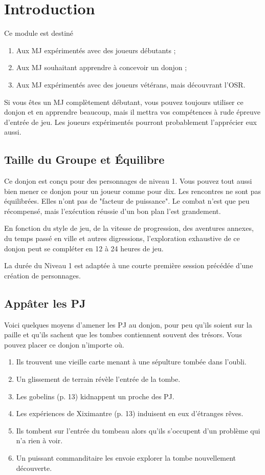 \chapter{Introduction}
Ce module est destiné
\begin{enumerate}
  \item Aux MJ expérimentés avec des joueurs débutants ;
  \item Aux MJ souhaitant apprendre à concevoir un donjon ;
  \item Aux MJ expérimentés avec des joueurs vétérans, mais découvrant l'OSR.
\end{enumerate}
Si vous êtes un MJ complètement débutant, vous pouvez toujours utiliser ce donjon et en apprendre beaucoup, mais il
mettra vos compétences à rude épreuve d'entrée de jeu.
Les joueurs expérimentés pourront probablement l'apprécier eux aussi.

\section{Taille du Groupe et Équilibre}
Ce donjon est conçu pour des personnages de niveau 1.
Vous pouvez tout aussi bien mener ce donjon pour un joueur comme pour dix.
Les rencontres ne sont pas équilibrées.
Elles n'ont pas de "facteur de puissance".
Le combat n'est que peu récompensé, mais l'exécution réussie d'un bon plan l'est grandement.

En fonction du style de jeu, de la vitesse de progression, des aventures annexes, du temps passé en ville et autres digressions, l'exploration exhaustive de ce donjon peut se compléter en 12 à 24 heures de jeu.

La durée du Niveau 1 est adaptée à une courte première session précédée d'une création de personnages.

\section{Appâter les PJ}
Voici quelques moyens d'amener les PJ au donjon, pour peu qu'ils soient sur la paille et qu'ils sachent que les tombes
contiennent souvent des trésors.
Vous pouvez placer ce donjon n'importe où.

\begin{enumerate}
  \item Ils trouvent une vieille carte menant à une sépulture tombée dans l'oubli.
  \item Un glissement de terrain révèle l'entrée de la tombe.
  \item Les gobelins (p. 13) kidnappent un proche des PJ.
  \item Les expériences de Xiximantre (p. 13) induisent en eux d'étranges rêves.
  \item Ils tombent sur l'entrée du tombeau alors qu'ils s'occupent d'un problème qui n'a rien à voir.
  \item Un puissant commanditaire les envoie explorer la tombe nouvellement découverte.
\end{enumerate}